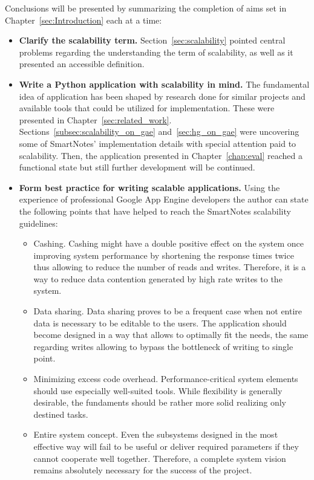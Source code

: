 Conclusions will be presented by summarizing the completion of aims set in Chapter~\ref{sec:Introduction} each at a time:
\begin{itemize}
\item{\textbf{Clarify the scalability term.} Section~\ref{sec:scalability} pointed central problems regarding the understanding the term of scalability, as well as it presented an accessible definition.}
\item{\textbf{Write a Python application with scalability in mind.} The fundamental idea of application has been shaped by research done for similar projects and available tools that could be utilized for implementation. These were presented in Chapter~\ref{sec:related_work}. Sections~\ref{subsec:scalability_on_gae} and~\ref{sec:hg_on_gae} were uncovering some of SmartNotes' implementation details with special attention paid to scalability. Then, the application presented in Chapter~\ref{chap:eval} reached a functional state but still further development will be continued.}
\item{\textbf{Form best practice for writing scalable applications.} Using the experience of professional Google App Engine developers \cite{gae_best_practices, mike_malone_quote} the author can state the following points that have helped to reach the SmartNotes scalability guidelines:
\begin{itemize}
\item{Cashing. Cashing might have a double positive effect on the system once improving system performance by shortening the response times twice thus allowing to reduce the number of reads and writes. Therefore, it is a way to reduce data contention generated by high rate writes to the system.}
\item{Data sharing. Data sharing proves to be a frequent case when not entire data is necessary to be editable to the users. The application should become designed in a way that allows to optimally fit the needs, the same regarding writes allowing to bypass the bottleneck of writing to single point.}
\item{Minimizing excess code overhead. Performance-critical system elements should use especially well-suited tools. While flexibility is generally desirable, the fundaments should be rather more solid realizing only destined tasks.}
\item{Entire system concept. Even the subsystems designed in the most effective way will fail to be useful or deliver required parameters if they cannot cooperate well together. Therefore, a complete system vision remains absolutely necessary for the success of the project.}
\end{itemize}
}
\end{itemize} 